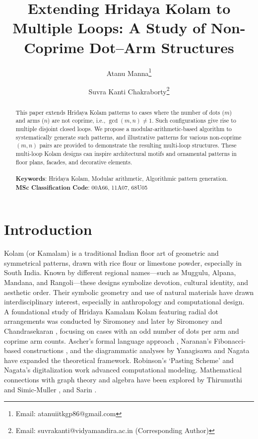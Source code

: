\documentclass[12pt,a4paper]{article}
\title{Extending Hridaya Kolam to Multiple Loops: A Study of Non-Coprime Dot--Arm Structures}
\author[1]{Atanu Manna\thanks{Email: atanuiitkgp86@gmail.com}}
\author[2]{Suvra Kanti Chakraborty\thanks{Email: suvrakanti@vidyamandira.ac.in (Corresponding Author)}}
\affil[1]{\small Indian Institute of Carpet Technology, Chauri Road, Bhadohi--221401, Uttar Pradesh, India}
\affil[2]{\small Ramakrishna Mission Vidyamandira, Belur Math--711202, West Bengal, India}
\date{}
\theoremstyle{remark} %
\theoremstyle{example} %
\theoremstyle{proposition}
\begin{document}
\maketitle
\begin{abstract}
\noindent This paper extends Hridaya Kolam patterns to cases where the number of dots ($m$) and arms ($n$) are not coprime, i.e., $\gcd(m, n) \ne 1$. Such configurations give rise to multiple disjoint closed loops. We propose a modular-arithmetic-based algorithm to systematically generate such patterns, and illustrative patterns for various non-coprime $(m, n)$ pairs are provided to demonstrate the resulting multi-loop structures. 
These multi-loop Kolam designs can inspire architectural motifs and ornamental patterns in floor plans, facades, and decorative elements.\\\\
\noindent \textbf{Keywords}: Hridaya Kolam, Modular arithmetic, Algorithmic pattern generation.
\noindent \textbf{MSc Classification Code}: 00A66, 11A07, 68U05
\end{abstract}

\section{Introduction}


Kolam (or Kamalam) is a traditional Indian floor art of geometric and symmetrical patterns, drawn with rice flour or limestone powder, especially in South India. Known by different regional names—such as Muggulu, Alpana, Mandana, and Rangoli—these designs symbolize devotion, cultural identity, and aesthetic order. Their symbolic geometry and use of natural materials have drawn interdisciplinary interest, especially in anthropology and computational design.\\

\noindent A foundational study of Hridaya Kamalam Kolam featuring radial dot arrangements was conducted by Siromoney \cite{SIROMONEY78} and later by Siromoney and Chandrasekaran \cite{SIROCHANDRA}, focusing on cases with an odd number of dots per arm and coprime arm counts. Ascher's formal language approach \cite{ASCHER}, Naranan's Fibonacci-based constructions \cite{NARANAN, NARANAN2, NARANAN3, NARANAN4}, and the diagrammatic analyses by Yanagisawa and Nagata \cite{YANAGISAWA} have expanded the theoretical framework. Robinson’s ‘Pasting Scheme’ \cite{ROBINSON} and Nagata’s digitalization work \cite{NAGATA, NAGATA2} advanced computational modeling. Mathematical connections with graph theory and algebra have been explored by Thirumuthi and Simic-Muller \cite{THIRUMURTHY}, and Sarin \cite{SARIN}.\\
\end{document}
